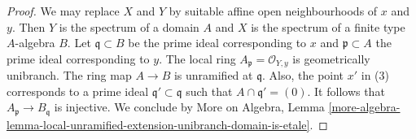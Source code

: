 \documentclass[10pt,a4paper]{amsart}
\theoremstyle{plain}
\theoremstyle{definition}
\theoremstyle{remark}
\numberwithin{equation}{subsection}
\begin{document}
\begin{proof}
We may replace $X$ and $Y$ by suitable affine open neighbourhoods
of $x$ and $y$. Then $Y$ is the spectrum of a domain $A$ and
$X$ is the spectrum of a finite type $A$-algebra $B$.
Let $\mathfrak q \subset B$ be the prime ideal corresponding
to $x$ and $\mathfrak p \subset A$ the prime ideal corresponding to $y$.
The local ring $A_\mathfrak p = \mathcal{O}_{Y, y}$ is geometrically unibranch.
The ring map $A \to B$ is unramified at $\mathfrak q$.
Also, the point $x'$ in (3) corresponds to a prime ideal
$\mathfrak q' \subset \mathfrak q$ such that $A \cap \mathfrak q' = (0)$.
It follows that $A_\mathfrak p \to B_\mathfrak q$ is injective.
We conclude by
More on Algebra, Lemma
\ref{more-algebra-lemma-local-unramified-extension-unibranch-domain-is-etale}.
\end{proof}
\end{document}
